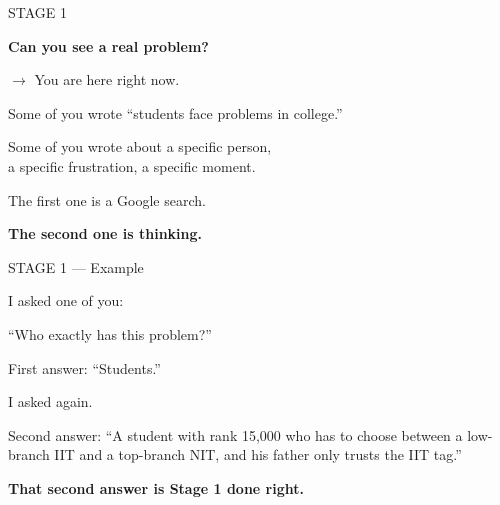 \documentclass[aspectratio=169]{beamer}
\begin{document}
\begin{frame}{}
\vfill
\begin{center}
{\color{stage}\fontsize{18}{22}\selectfont STAGE 1\par}
\vspace{10pt}
{\fontsize{28}{34}\selectfont\bfseries Can you see a real problem?\par}
\vspace{30pt}
{\color{accent}\large $\rightarrow$ You are here right now.\par}
\vspace{30pt}
\begin{minipage}{0.80\textwidth}
{\color{darktext}Some of you wrote ``students face problems in college.''\par}
\vspace{8pt}
{\color{darktext}Some of you wrote about a specific person,\\a specific frustration, a specific moment.\par}
\vspace{16pt}
{\color{dimtext}The first one is a Google search.\par}
\vspace{4pt}
{\color{accent}\bfseries The second one is thinking.\par}
\end{minipage}
\end{center}
\vfill
\end{frame}

{
\begin{frame}{}
\vfill
\begin{center}
{\color{stage}\normalsize STAGE 1 --- Example\par}
\vspace{16pt}
\begin{minipage}{0.82\textwidth}
{\color{darktext}I asked one of you:\par}
\vspace{8pt}
{\large\color{accent}``Who exactly has this problem?''\par}
\vspace{16pt}
{\color{dimtext}First answer: ``Students.''\par}
\vspace{12pt}
{\color{darktext}I asked again.\par}
\vspace{12pt}
{\color{darktext}Second answer: ``A student with rank 15,000 who has to choose between a low-branch IIT and a top-branch NIT, and his father only trusts the IIT tag.''\par}
\vspace{20pt}
{\color{accent}\bfseries That second answer is Stage 1 done right.\par}
\end{minipage}
\end{center}
\vfill
\end{frame}
}
\end{document}
